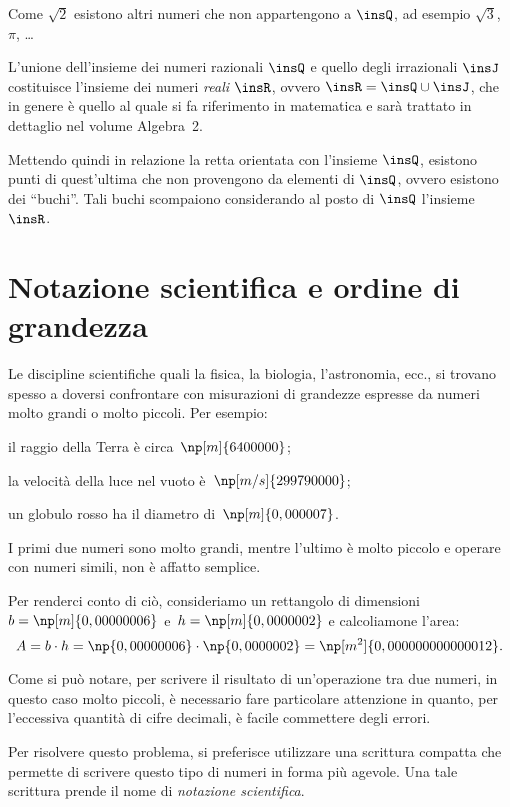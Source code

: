 Come $\sqrt{2}$ esistono altri numeri che non appartengono a $\insQ$, ad esempio $\sqrt{3}$, $\pi$, \ldots{}

L'unione dell'insieme dei numeri razionali $\insQ$ e quello degli irrazionali $\insJ$ costituisce l'insieme dei numeri \emph{reali} $\insR$, ovvero $\insR = \insQ \cup \insJ$, che in genere è quello al quale si fa riferimento in matematica e sarà trattato in dettaglio nel volume Algebra~2.

Mettendo quindi in relazione la retta orientata con l'insieme $\insQ$, esistono punti di quest'ultima che non provengono da elementi di $\insQ$, ovvero esistono dei ``buchi''. Tali buchi scompaiono considerando al posto di $\insQ$ l'insieme $\insR$.

\section{Notazione scientifica e ordine di grandezza}

Le discipline scientifiche quali la fisica, la biologia, l'astronomia, ecc.,
si trovano spesso a doversi confrontare con misurazioni di grandezze espresse da numeri molto grandi o molto piccoli. Per esempio:
\begin{itemize*}
\item il raggio della Terra è circa~$\np[m]{6400000}$;
\item la velocità della luce nel vuoto è~$\np[m/s]{299790000}$;
\item un globulo rosso ha il diametro di~$\np[m]{0,000007}$.
\end{itemize*}
I primi due numeri sono molto grandi, mentre l'ultimo è molto piccolo e operare con numeri simili,
non è affatto semplice.

Per renderci conto di ciò, consideriamo un rettangolo di dimensioni
$b = \np[m]{0,00000006}$ e~$h = \np[m]{0,0000002}$ e calcoliamone l'area:
\[A=b\cdot h=\np{0,00000006}\cdot\np{0,0000002}=\np[m^2]{0,000000000000012}.\]

\begin{center}

\end{center}

Come si può notare, per scrivere il risultato di un'operazione tra due numeri, in questo caso molto piccoli,
è necessario fare particolare attenzione in quanto, per l'eccessiva quantità di cifre decimali,
è facile commettere degli errori.

Per risolvere questo problema, si preferisce utilizzare una scrittura compatta che
permette di scrivere questo tipo di numeri in forma più agevole.
Una tale scrittura prende il nome di \emph{notazione scientifica}.

